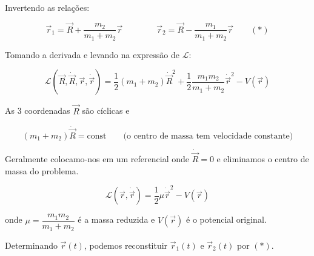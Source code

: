 Invertendo as relações:

\begin{equation}
\vec{r}_1 = \vec{R} + \frac{m_2}{m_1+m_2}\vec{r} \qquad\qquad \vec{r}_2 = \vec{R} - \frac{m_1}{m_1+m_2}\vec{r} \qquad (*)
\label{eq:aula8_relacoes_invertidas}
\end{equation}

Tomando a derivada e levando na expressão de $\mathcal{L}$:

\begin{equation}
\mathcal{L}(\vec{R}, \dot{\vec{R}}, \vec{r}, \dot{\vec{r}}) = \frac{1}{2}(m_1+m_2)\dot{\vec{R}}^2 + \frac{1}{2}\frac{m_1 m_2}{m_1+m_2}\dot{\vec{r}}^2 - V(\vec{r})
\label{eq:aula8_lagrangiana_cm_relativa}
\end{equation}

As 3 coordenadas $\vec{R}$ são cíclicas e

\begin{equation}
(m_1+m_2)\dot{\vec{R}} = \text{const} \qquad \text{(o centro de massa tem velocidade constante)}
\label{eq:aula8_momentum_cm}
\end{equation}

Geralmente colocamo-nos em um referencial onde $\dot{\vec{R}} = 0$ e eliminamos o centro de massa do problema.

\begin{equation}
\boxed{\mathcal{L}(\vec{r}, \dot{\vec{r}}) = \frac{1}{2}\mu\dot{\vec{r}}^2 - V(\vec{r})}
\label{eq:aula8_lagrangiana_massa_reduzida}
\end{equation}

onde $\mu = \dfrac{m_1 m_2}{m_1+m_2}$ é a massa reduzida e $V(\vec{r})$ é o potencial original.

Determinando $\vec{r}(t)$, podemos reconstituir $\vec{r}_1(t)$ e $\vec{r}_2(t)$ por $(*)$.

